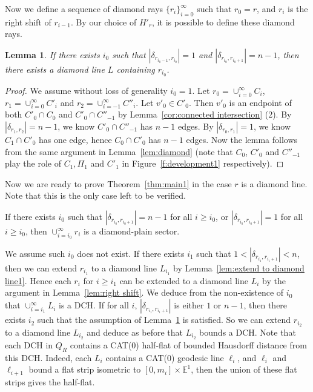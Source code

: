 \documentclass[11pt]{amsart}
\newtheorem{lemma}[theorem]{Lemma}
\theoremstyle{definition}
\begin{document}
Now we define a sequence of diamond rays $\{r_i\}_{i=0}^{\infty}$ such that $r_0=r$, and $r_{i}$ is the right shift of $r_{i-1}$. By our choice of $H'_r$, it is possible to define these diamond rays.

\begin{lemma}
	\label{lem:extend to diamond line2}
	If there exists $i_0$ such that $|\delta_{r_{i_0-1},r_{i_0}}|=1$ and $|\delta_{r_{i_0},r_{i_0+1}}|=n-1$, then there exists a diamond line $L$ containing $r_{i_0}$.
\end{lemma}

\begin{proof}
	We assume without loss of generality $i_0=1$. Let $r_0=\cup_{i=0}^{\infty} C_i$, $r_1=\cup_{i=0}^{\infty}C'_i$ and $r_2=\cup_{i=-1}^{\infty}C''_i$. Let $v'_0\in C'_0$. Then $v'_0$ is an endpoint of both $C'_0\cap C_0$ and $C'_0\cap C''_{-1}$ by Lemma~\ref{cor:connected intersection} (2). By $|\delta_{r_1,r_2}|=n-1$, we know $C'_0\cap C''_{-1}$ has $n-1$ edges. By $|\delta_{r_0,r_1}|=1$, we know $C_1\cap C'_0$ has one edge, hence $C_0\cap C'_0$ has $n-1$ edges. Now the lemma follows from the same argument in Lemma~\ref{lem:diamond} (note that $C_0$, $C'_0$ and $C''_{-1}$ play the role of $C_1,\Pi_1$ and $C'_1$ in Figure~\ref{f:development1} respectively).
\end{proof}
\medskip

Now we are ready to prove Theorem~\ref{thm:main1} in the case $r$ is a diamond line. Note that this is the 
only case left to be verified.

If there exists $i_0$ such that $|\delta_{r_{i_0},r_{i_0+1}}|=n-1$ for all $i\ge i_0$, or $|\delta_{r_{i_0},r_{i_0+1}}|=1$ for all $i\ge i_0$, then $\cup_{i=i_0}^{\infty} r_i$ is a diamond-plain sector.

We assume such $i_0$ does not exist. If there exists $i_1$ such that $1<|\delta_{r_{i_1},r_{i_1+1}}|<n$, then we can extend $r_{i_1}$ to a diamond line $L_{i_1}$ by Lemma~\ref{lem:extend to diamond line1}. Hence each $r_i$ for $i\ge i_1$ can be extended to a diamond line $L_i$ by the argument in Lemma~\ref{lem:right shift}. We deduce from the non-existence of $i_0$ that $\cup_{i=i_1}^{\infty} L_i$ is a DCH. If for all $i$, $|\delta_{r_{i_1},r_{i_1+1}}|$ is either $1$ or $n-1$, then there exists $i_2$ such that the assumption of Lemma~\ref{lem:extend to diamond line2} is satisfied. So we can extend $r_{i_2}$ to a diamond line $L_{i_2}$ and deduce as before that $L_{i_2}$ bounds a DCH. Note that each DCH in $Q_R$ contains a CAT(0) half-flat of bounded Hausdorff distance from this DCH. Indeed, each $L_i$ contains a CAT(0) geodesic line $\ell_i$, and $\ell_i$ and $\ell_{i+1}$ bound a flat strip isometric to $[0,m_i]\times \mathbb E^1$, then the union of these flat strips gives the half-flat. 
\medskip 
\end{document}
